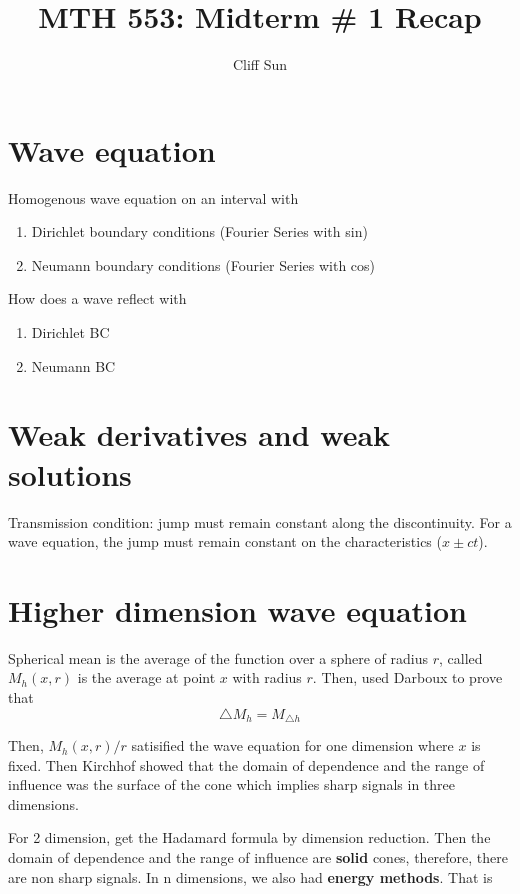 \documentclass{article}
\title{MTH 553: Midterm \# 1 Recap}
\author{Cliff Sun}
\newtheorem{one minute paper}[theorem]{One Minute Paper}
\begin{document}
\maketitle

\section*{Wave equation}

Homogenous wave equation on an interval with 
\begin{enumerate}
    \item Dirichlet boundary conditions (Fourier Series with sin)
    \item Neumann boundary conditions (Fourier Series with cos)
\end{enumerate}

How does a wave reflect with 
\begin{enumerate}
    \item Dirichlet BC 
    \item Neumann BC
\end{enumerate}

\section*{Weak derivatives and weak solutions}

Transmission condition: jump must remain constant along the discontinuity. For a wave equation, the jump must remain constant on the characteristics ($x \pm ct$). 

\section*{Higher dimension wave equation}

Spherical mean is the average of the function over a sphere of radius $r$, called $M_h(x,r)$ is the average at point $x$ with radius $r$. Then, used Darboux to prove that $$\triangle M_h = M_{\triangle h}$$

Then, $M_h(x,r)/r$ satisified the wave equation for one dimension where $x$ is fixed. Then Kirchhof showed that the domain of dependence and the range of influence was the 
surface of the cone which implies sharp signals in three dimensions.

For 2 dimension, get the Hadamard formula by dimension reduction. Then the domain of dependence and the range of influence are \textbf{solid} cones, therefore, there are non sharp signals. In n dimensions, 
we also had \textbf{energy methods}. That is 
\end{document}
